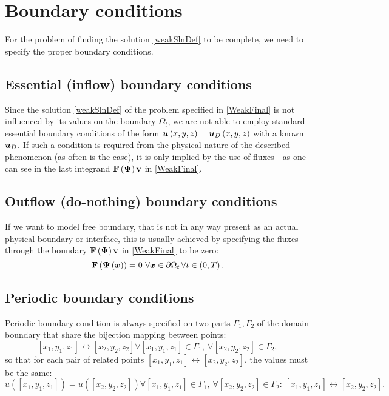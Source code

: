 \section{Boundary conditions}
\label{section:bcs}
For the problem of finding the solution \ref{weakSlnDef} to be complete, we need to specify the proper boundary conditions.
\subsection{Essential (inflow) boundary conditions}

Since the solution \ref{weakSlnDef} of the problem specified in \ref{WeakFinal} is not influenced by its values on the boundary $\Omega_t$, we are not able to employ standard essential boundary conditions of the form $\mbox{\boldmath $u$}\left(x, y, z\right) = \mbox{\boldmath $u$}_D\left(x, y, z\right)$ with a known $\mbox{\boldmath $u$}_D$.
If such a condition is required from the physical nature of the described phenomenon (as often is the case), it is only implied by the use of fluxes - as one can see in the last integrand $\mathrm{\mathbf{F}}\left(\mathrm{\mathbf{\Psi}}\right) \mathrm{\mathbf{v}}$ in \ref{WeakFinal}.


\subsection{Outflow (do-nothing) boundary conditions}
If we want to model free boundary, that is not in any way present as an actual physical boundary or interface, this is usually achieved by specifying the fluxes through the boundary $\mathrm{\mathbf{F}}\left(\mathrm{\mathbf{\Psi}}\right) \mathrm{\mathbf{v}}$ in \ref{WeakFinal} to be zero:
$$
\mrF\lo\mrPsi\lo\bfx\ro\ro = 0\ \forall\bfx\in\partial\Omega_t\, \forall t\in \lo0, T\ro.
$$


\subsection{Periodic boundary conditions}
Periodic boundary condition is always specified on two parts $\Gamma_1, \Gamma_2$ of the domain boundary that share the bijection mapping between points:
$$
\left[x_1, y_1, z_1\right] \leftrightarrow \left[x_2, y_2, z_2\right] \forall \left[x_1, y_1, z_1\right] \in \Gamma_1,\ \forall \left[x_2, y_2, z_2\right] \in \Gamma_2,
$$
so that for each pair of related points $\left[x_1, y_1, z_1\right] \leftrightarrow \left[x_2, y_2, z_2\right]$, the values must be the same:
$$
u\left(\left[x_1, y_1, z_1\right]\right) = u\left(\left[x_2, y_2, z_2\right]\right) \forall \left[x_1, y_1, z_1\right] \in \Gamma_1,\ \forall \left[x_2, y_2, z_2\right] \in \Gamma_2:\, \left[x_1, y_1, z_1\right] \leftrightarrow \left[x_2, y_2, z_2\right].
$$
